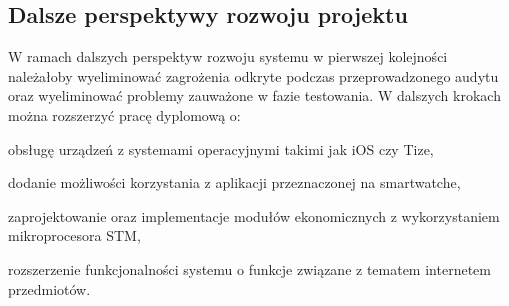 	\subsection{Dalsze perspektywy rozwoju projektu}
	W ramach dalszych perspektyw rozwoju systemu \NazwaSys w pierwszej kolejności należałoby wyeliminować zagrożenia odkryte podczas przeprowadzonego audytu oraz  wyeliminować problemy zauważone w fazie testowania. 
	W dalszych krokach można rozszerzyć pracę dyplomową o:
	\begin{itemize*}
	\item  obsługę urządzeń z systemami operacyjnymi takimi jak iOS czy Tize,
	\item dodanie możliwości korzystania z aplikacji przeznaczonej na smartwatche, 
	\item zaprojektowanie oraz implementacje modułów ekonomicznych z wykorzystaniem mikroprocesora STM,
	\item rozszerzenie funkcjonalności systemu o funkcje związane z tematem internetem przedmiotów.
	 
	\end{itemize*}
	
 
	 